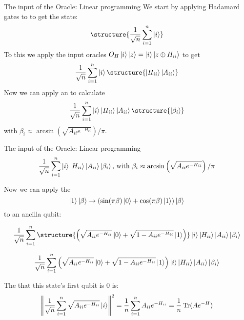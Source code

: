 \begin{frame}{The input of the Oracle: Linear programming}
We start by applying Hadamard gates to  to get the state:
\begin{equation*}
\structure{\frac{1}{\sqrt{n}}\sum_{i=1}^n\ket{i}}
\end{equation*}
\pause
To this we apply the input oracles $O_H\ket{i}\ket{z}=\ket{i}\ket{z\oplus H_{ii}}$ to get
\begin{equation*}
\frac{1}{\sqrt{n}}\sum_{i=1}^n\ket{i}\structure{\ket{H_{ii}}\ket{A_{ii}}}
\end{equation*}
\pause
Now we can apply an  to calculate
\begin{equation*}
\frac{1}{\sqrt{n}}\sum_{i=1}^n\ket{i}\ket{H_{ii}}\ket{A_{ii}}\structure{\ket{\beta_i}}
\end{equation*}
with $\beta_i\approx\arcsin\left(\sqrt{A_{ii}e^{-H_{ii}}}\right)/\pi$.

\end{frame}

\begin{frame}{The input of the Oracle: Linear programming}
\begin{equation*}
\frac{1}{\sqrt{n}}\sum_{i=1}^n\ket{i}\ket{H_{ii}}\ket{A_{ii}}\ket{\beta_i} \text{, with } \beta_i\approx\arcsin\left(\sqrt{A_{ii}e^{-H_{ii}}}\right)/\pi
\end{equation*}

\vspace{1cm}

Now we can apply the 
\begin{equation*}
\ket{1}\ket{\beta}\to (\sin(\pi\beta)\ket{0}+\cos(\pi\beta)\ket{1})\ket{\beta}
\end{equation*}
to an ancilla qubit:

\begin{equation*}
\frac{1}{\sqrt{n}}\sum_{i=1}^n\structure{\left(\sqrt{A_{ii}e^{-H_{ii}}}\ket{0}+\sqrt{1-A_{ii}e^{-H_{ii}}}\ket{1}\right)}\ket{i}\ket{H_{ii}}\ket{A_{ii}}\ket{\beta_i}
\end{equation*}
\end{frame}

\begin{frame}
\begin{equation*}
\frac{1}{\sqrt{n}}\sum_{i=1}^n\left(\sqrt{A_{ii}e^{-H_{ii}}}\ket{0}+\sqrt{1-A_{ii}e^{-H_{ii}}}\ket{1}\right)\ket{i}\ket{H_{ii}}\ket{A_{ii}}\ket{\beta_i}
\end{equation*}

The  that this state's first qubit is 0 is:
\begin{equation*}
\left\|\frac{1}{\sqrt{n}}\sum_{i=1}^n\sqrt{A_{ii}e^{-H_{ii}}}\ket{i}\right\|^2=\frac{1}{n}\sum_{i=1}^n A_{ii}e^{-H_{ii}}=\frac{1}{n}\operatorname{Tr}(Ae^{-H})
\end{equation*}
\end{frame}


